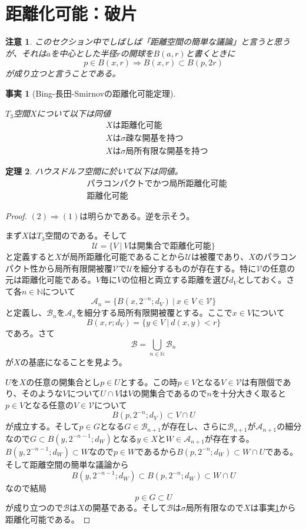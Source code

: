 \documentclass[leqno]{jsarticle}
\newtheorem{thm}{定理}
\newtheorem{fact}[thm]{事実}
\newtheorem*{cau}{注意}
\newcommand{\To}{\Longrightarrow}
\newcommand{\nn}{\mathbb{N}}
\newcommand{\uu}{\mathcal{U}}
\newcommand{\vv}{\mathcal{V}}
\newcommand{\A}{\mathcal{A}}
\newcommand{\B}{\mathcal{B}}
\begin{document}
\section{距離化可能：破片}
\begin{cau}
このセクション中でしばしば「距離空間の簡単な議論」と言うと思うが、それは$a$を中心とした半径$r$の開球を$B(a,r)$と書くときに
\[
p\in B(x,r)\To B(x,r)\subset B(p,2r)
\]
が成り立つと言うことである。
\end{cau}
\begin{fact}[Bing-長田-Smirnovの距離化可能定理]\label{dis}

$T_3$空間$X$について以下は同値
\begin{align}
&\mbox{$X$は距離化可能}\\
&\mbox{$X$は$\sigma$疎な開基を持つ}\\
&\mbox{$X$は$\sigma$局所有限な開基を持つ}
\end{align}
\end{fact}


\setcounter{equation}{0}
\begin{thm}\label{aaa}
ハウスドルフ空間に於いて以下は同値。
\begin{align}
&\mbox{パラコンパクトでかつ局所距離化可能}\\
&\mbox{距離化可能}
\end{align}
\end{thm}
\begin{proof}
$(2)\To(1)$は明らかである。逆を示そう。\par
まず$X$は$T_3$空間のである。そして
\[
\uu=\{V\ |\ \text{$V$は開集合で距離化可能}\}
\]
と定義すると$X$が局所距離化可能であることから$\uu$は被覆であり、$X$のパラコンパクト性から局所有限開被覆$\vv$で$\uu$を細分するものが存在する。特に$\vv$の任意の元は距離化可能である。$V$毎に$V$の位相と両立する距離を選び$d_V$としておく。さて各$n\in \nn$について
\[
\A_n=\{B(x,2^{-n};d_V)\ |\ x\in V\in \vv\}
\]
と定義し、$\B_n$を$\A_n$を細分する局所有限開被覆とする。ここで$x\in V$について
\[
B(x,r;d_V)=\{y\in V\ |\ d(x,y)<r\}
\]
であろ。さて
\[
\B=\bigcup_{n\in \nn}\B_n
\]
が$X$の基底になることを見よう。\par
$U$を$X$の任意の開集合とし$p\in U$とする。この時$p\in V$となる$V\in \vv$は有限個であり、そのような$V$について$U\cap V$は$V$の開集合であるので$n$を十分大きく取ると$p\in V$となる任意の$V\in \vv$について
\[
B(p,2^{-n};d_V)\subset V\cap U
\]
が成立する。そして$p\in G$となる$G\in \B_{n+1}$が存在し、さらに$\B_{n+1}$が$\A_{n+1}$の細分なので$G\subset B(y,2^{-n-1};d_W)$となる$y\in X$と$W\in \A_{n+1}$が存在する。$B(y,2^{-n-1};d_W)\subset W$なので$p\in W$であるから$B(p,2^{-n};d_W)\subset W\cap U$である。そして距離空間の簡単な議論から
\[
B(y,2^{-n-1};d_W)\subset B(p,2^{-n};d_W)\subset W\cap U
\]
なので結局
\[
p\in G\subset U
\]
が成り立つので$\B$は$X$の開基である。そして$\B$は$\sigma$局所有限なので$X$は事実\ref{dis}から距離化可能である。
\end{proof}
\end{document}
